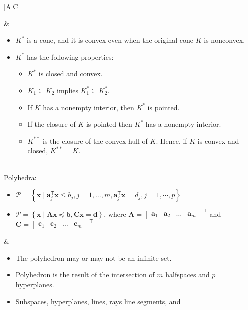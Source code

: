 \documentclass{article}
\newcommand{\trans}{\mathsf{T}}
\begin{document}
\begin{table}[ht!]
\begin{tabularx}{\textwidth}{|A|C|}
\begin{itemize}
\end{itemize} & \vspace{-3.5ex} \begin{itemize}[leftmargin=*]
    \item \(K^*\) is a cone, and it is convex even when the original cone \(K\) is nonconvex.
    \item \(K^*\) has the following properties:
    \begin{itemize}[label={$\triangleright$}]
        \item \(K^*\) is closed and convex.
        \item \(K_1 \subseteq K_2\) implies \(K_1^* \subseteq K_2^*\).
        \item If \(K\) has a nonempty interior, then \(K^*\) is pointed.
        \item If the closure of \(K\) is pointed then \(K^*\) has a nonempty interior.
        \item \(K^{**}\) is the closure of the convex hull of \(K\). Hence, if \(K\) is convex and closed, \(K^{**}=K\).
    \end{itemize}
\end{itemize} \\
\hline
Polyhedra:
\begin{itemize}[leftmargin=*]
    \item $\mathcal{P} = \left\{ \mathbf{x} \mid \mathbf{a}_j^\trans \mathbf{x} \leq b_j, j=1, \dots, m, \mathbf{a}_j^\trans \mathbf{x} = d_j, j=1,\cdots, p  \right\}$
    \item \(\mathcal{P} = \left\{ \mathbf{x} \mid \mathbf{Ax} \preceq \mathbf{b}, \mathbf{Cx} = \mathbf{d} \right\}\), where \(\mathbf{A} = \begin{bmatrix}
            \mathbf{a}_1 & \mathbf{a}_2 & \dots & \mathbf{a}_m
        \end{bmatrix}^\trans\) and \(\mathbf{C} = \begin{bmatrix}
            \mathbf{c}_1 & \mathbf{c}_2 & \dots & \mathbf{c}_m
        \end{bmatrix}^\trans\)
\end{itemize} & \vspace{-3.5ex}
\begin{itemize}[leftmargin=*]
    \item The polyhedron may or may not be an infinite set.
    \item Polyhedron is the result of the intersection of \(m\) halfspaces and \(p\) hyperplanes.
    \item Subspaces, hyperplanes, lines, rays line segments, and

\end{itemize}
\end{tabularx}
\end{table}
\end{document}
